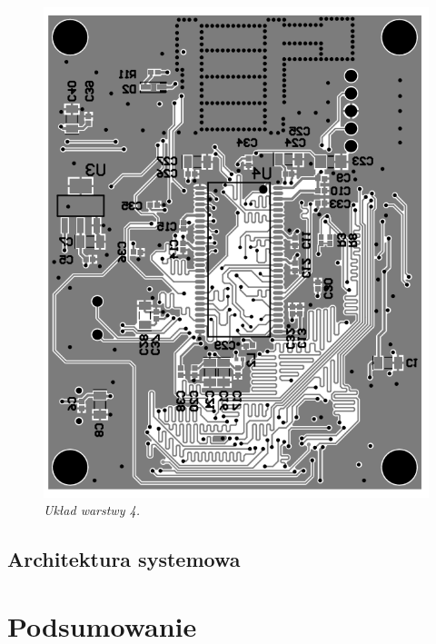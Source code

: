 \documentclass[eng,printmode]{mgr}
\begin{document}
\begin{center}\centering
\vspace*{\fill}
\begin{figure}[!h]
    \centering
    \includegraphics[width=\textwidth]{pcb/bottom.png}
    \caption{\textit{\scriptsize Układ warstwy 4.}}
\end{figure}
\vfill
\end{center}
\newpage

\section{Architektura systemowa}
\chapter{ Podsumowanie }



\end{document}
